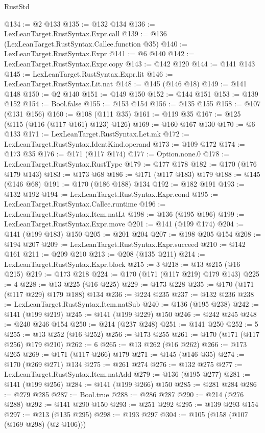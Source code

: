 \begin{lexlean}{RustStd}
\begin{coremodule}
@134 := @2 @133
@135 := @132 @134
@136 := LexLeanTarget.RustSyntax.Expr.call
@139 := @136 (LexLeanTarget.RustSyntax.Callee.function @35)
@140 := LexLeanTarget.RustSyntax.Expr
@141 := @6 @140
@142 := LexLeanTarget.RustSyntax.Expr.copy
@143 := @142 @120
@144 := @141 @143
@145 := LexLeanTarget.RustSyntax.Expr.lit
@146 := LexLeanTarget.RustSyntax.Lit.nat
@148 := @145 (@146 @18)
@149 := @141 @148
@150 := @2 @140
@151 := @149 @150
@152 := @144 @151
@153 := @139 @152
@154 := Bool.false
@155 := @153 @154
@156 := @135 @155
@158 := @107 (@131 @156)
@160 := @108 (@111 @35)
@161 := @119 @35
@167 := @125 (@115 (@116 (@117 @161) @123) @126)
@169 := @160 @167 @130
@170 := @6 @133
@171 := LexLeanTarget.RustSyntax.Let.mk
@172 := LexLeanTarget.RustSyntax.IdentKind.operand
@173 := @109 @172
@174 := @173 @35
@176 := @171 (@117 @174)
@177 := Option.none.{0}
@178 := LexLeanTarget.RustSyntax.RustType
@179 := @177 @178
@182 := @170 (@176 @179 @143)
@183 := @173 @68
@186 := @171 (@117 @183) @179
@188 := @145 (@146 @68)
@191 := @170 (@186 @188) @134
@192 := @182 @191
@193 := @132 @192
@194 := LexLeanTarget.RustSyntax.Expr.cond
@195 := LexLeanTarget.RustSyntax.Callee.runtime
@196 := LexLeanTarget.RustSyntax.Item.natLt
@198 := @136 (@195 @196)
@199 := LexLeanTarget.RustSyntax.Expr.move
@201 := @141 (@199 @174)
@204 := @141 (@199 @183) @150
@205 := @201 @204
@207 := @198 @205 @154
@208 := @194 @207
@209 := LexLeanTarget.RustSyntax.Expr.succeed
@210 := @142 @161
@211 := @209 @210
@213 := @208 (@135 @211)
@214 := LexLeanTarget.RustSyntax.Expr.block
@215 := 3
@218 := @13 @215 (@16 @215)
@219 := @173 @218
@224 := @170 (@171 (@117 @219) @179 @143)
@225 := 4
@228 := @13 @225 (@16 @225)
@229 := @173 @228
@235 := @170 (@171 (@117 @229) @179 @188) @134
@236 := @224 @235
@237 := @132 @236
@238 := LexLeanTarget.RustSyntax.Item.natSub
@240 := @136 (@195 @238)
@242 := @141 (@199 @219)
@245 := @141 (@199 @229) @150
@246 := @242 @245
@248 := @240 @246 @154
@250 := @214 (@237 @248)
@251 := @141 @250
@252 := 5
@255 := @13 @252 (@16 @252)
@256 := @173 @255
@261 := @170 (@171 (@117 @256) @179 @210)
@262 := 6
@265 := @13 @262 (@16 @262)
@266 := @173 @265
@269 := @171 (@117 @266) @179
@271 := @145 (@146 @35)
@274 := @170 (@269 @271) @134
@275 := @261 @274
@276 := @132 @275
@277 := LexLeanTarget.RustSyntax.Item.natAdd
@279 := @136 (@195 @277)
@281 := @141 (@199 @256)
@284 := @141 (@199 @266) @150
@285 := @281 @284
@286 := @279 @285
@287 := Bool.true
@288 := @286 @287
@290 := @214 (@276 @288)
@292 := @141 @290 @150
@293 := @251 @292
@295 := @139 @293 @154
@297 := @213 (@135 @295)
@298 := @193 @297
@304 := @105 (@158 (@107 (@169 @298) (@2 @106)))

\end{coremodule}
\end{lexlean}
